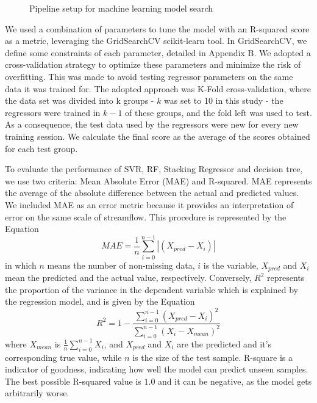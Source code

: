 \documentclass[12pt]{article}
\begin{document}
\begin{figure}[htbp]
    \centering
    {\footnotesize}
    \caption{Pipeline setup for machine learning model search}
    \label{fig:pipelines}
\end{figure}

We used a combination of parameters to tune the model with an R-squared score as a metric, leveraging the GridSearchCV scikit-learn tool. In GridSearchCV, we define some constraints of each parameter, detailed in Appendix B. We adopted a cross-validation strategy to optimize these parameters and minimize the risk of overfitting. This was made to avoid testing regressor parameters on the same data it was trained for. The adopted approach was K-Fold cross-validation, where the data set was divided into k groups - $k$ was set to 10 in this study - the regressors were trained in $k-1$ of these groups, and the fold left was used to test. As a consequence, the test data used by the regressors were new for every new training session. We calculate the final score as the average of the scores obtained for each test group.

To evaluate the performance of SVR, RF, Stacking Regressor and decision tree, we use two criteria: Mean Absolute Error (MAE) and R-squared. MAE represents the average of the absolute difference between the actual and predicted values. We included MAE as an error metric because it provides an interpretation of error on the same scale of streamflow. This procedure is represented by the Equation
    \begin{equation}
        \label{eqn:mae}
        MAE={\frac{1}{n}\sum_{i=0}^{n-1}|(X_{pred}-X_{i})|}
    \end{equation}
in which $n$ means the number of non-missing data, $i$ is the variable, $X_{pred}$ and $X_{i}$ mean the predicted and the actual value, respectively. Conversely, $R^2$ represents the proportion of the variance in the dependent variable which is explained by the regression model, and is given by the Equation
    \begin{equation}
        \label{eqn:r2}
        R^2={1 - \frac{\sum\limits_{i=0}^{n-1}(X_{pred}-X_{i})^{2}}
                      {\sum\limits_{i=0}^{n-1}(X_{i}-X_{mean})^{2}}}
    \end{equation}
where $X_{mean}$ is $\frac{1}{n}\sum_{i=0}^{n-1}X_{i}$, and $X_{pred}$ and $X_{i}$ are the predicted and it's corresponding true value, while $n$ is the size of the test sample. R-square is a indicator of goodness, indicating how well the model can predict unseen samples. The best possible R-squared value is $1.0$ and it can be negative, as the model gets arbitrarily worse.
\end{document}

